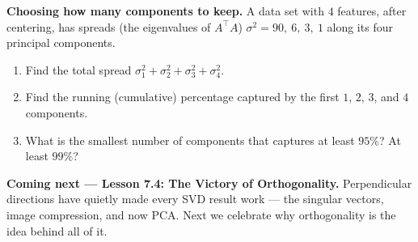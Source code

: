 \documentclass[10pt]{article}
\newcommand{\T}{^{\top}}
\begin{document}
\begin{extensionbox}
\textbf{Choosing how many components to keep.} A data set with $4$ features, after centering, has spreads
(the eigenvalues of $A\T A$) $\sigma^2=90,\ 6,\ 3,\ 1$ along its four principal components.
\begin{enumerate}[label=(\alph*), leftmargin=1.8em, itemsep=4pt]
  \item Find the total spread $\sigma_1^2+\sigma_2^2+\sigma_3^2+\sigma_4^2$.
  \item Find the running (cumulative) percentage captured by the first $1$, $2$, $3$, and $4$ components.
  \item What is the smallest number of components that captures at least $95\%$? At least $99\%$?
\end{enumerate}
\end{extensionbox}

\begin{spiralbox}
\textbf{Coming next --- Lesson 7.4: The Victory of Orthogonality.} Perpendicular directions have quietly made
every SVD result work --- the singular vectors, image compression, and now PCA. Next we celebrate why
orthogonality is the idea behind all of it.
\end{spiralbox}
\end{document}
